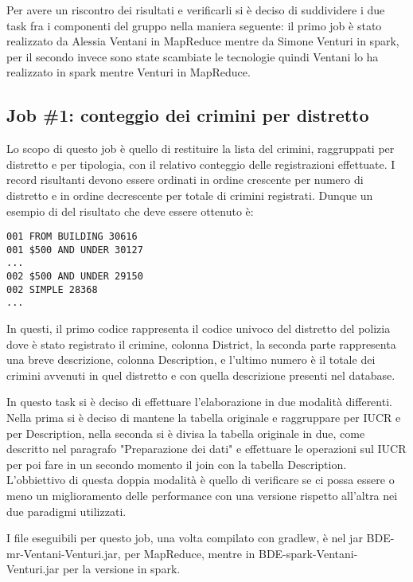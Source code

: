 \documentclass[10pt]{article}
\begin{document}
Per avere un riscontro dei risultati e verificarli si è deciso di suddividere i due task fra i componenti del gruppo nella maniera seguente: il primo job è stato realizzato da Alessia Ventani in MapReduce mentre da Simone Venturi in spark, per il secondo invece sono state scambiate le tecnologie quindi Ventani lo ha realizzato in spark mentre Venturi in MapReduce.


\subsection{Job \#1: conteggio dei crimini per distretto}
Lo scopo di questo job è quello di restituire la lista del crimini, raggruppati per distretto e per tipologia, con il relativo conteggio delle registrazioni effettuate. I record risultanti devono essere ordinati in ordine crescente per numero di distretto e in ordine decrescente per totale di crimini registrati. Dunque un esempio di del risultato che deve essere ottenuto è:
\begin{lstlisting}
001	FROM BUILDING 30616
001	$500 AND UNDER 30127
...
002	$500 AND UNDER 29150
002	SIMPLE 28368
...
\end{lstlisting}
In questi, il primo codice rappresenta il codice univoco del distretto del polizia dove è stato registrato il crimine, colonna District, la seconda parte rappresenta una breve descrizione, colonna Description, e l'ultimo numero è il totale dei crimini avvenuti in quel distretto e con quella descrizione presenti nel database.

In questo task si è deciso di effettuare l'elaborazione in due modalità differenti. Nella prima si è deciso di mantene la tabella originale e raggruppare per IUCR e per Description, nella seconda si è divisa la tabella originale in due, come descritto nel paragrafo "Preparazione dei dati" e effettuare le operazioni sul IUCR per poi fare in un secondo momento il join con la tabella Description.\\
L'obbiettivo di questa doppia modalità è quello di verificare se ci possa essere o meno un miglioramento delle performance con una versione rispetto all'altra nei due paradigmi utilizzati.

I file eseguibili per questo job, una volta compilato con gradlew, è nel jar BDE-mr-Ventani-Venturi.jar, per MapReduce, mentre in BDE-spark-Ventani-Venturi.jar per la versione in spark. 
\end{document}

